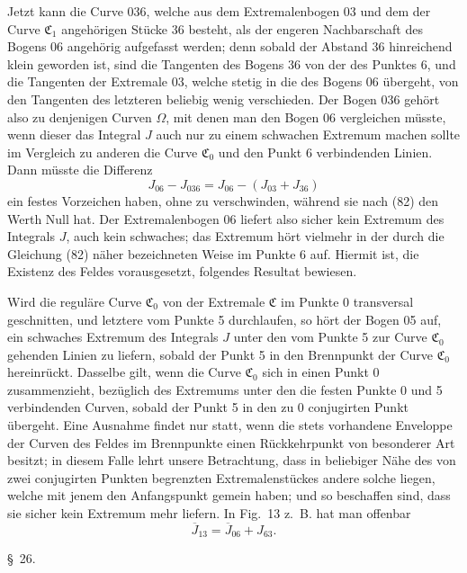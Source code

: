 \documentclass[11pt,a4paper,leqno]{article}
\begin{document}
Jetzt kann die Curve 036, welche aus dem Extremalenbogen 03 und dem der Curve $\mathfrak{C}_1$ angehörigen Stücke 36 besteht, als der engeren Nachbarschaft des Bogens 06 angehörig aufgefasst werden; denn sobald der Abstand 36 hinreichend klein geworden ist, sind die Tangenten des Bogens 36 von der des Punktes 6, und die Tangenten der Extremale 03, welche stetig in die des Bogens 06 übergeht, von den Tangenten des letzteren beliebig wenig verschieden. Der Bogen 036 gehört also zu denjenigen Curven $\Omega$, mit denen man den Bogen 06 vergleichen müsste, wenn dieser das Integral $J$ auch nur zu einem schwachen Extremum machen sollte im Vergleich zu anderen die Curve $\mathfrak{C}_0$ und den Punkt 6 verbindenden Linien. Dann müsste die Differenz
\[
J_{06}-J_{036}=J_{06}-(J_{03}+J_{36})
\]
ein festes Vorzeichen haben, ohne zu verschwinden, während sie nach (82) den Werth Null hat. Der Extremalenbogen 06 liefert also sicher kein Extremum des Integrals $J$, auch kein schwaches; das Extremum hört vielmehr in der durch die Gleichung (82) näher bezeichneten Weise im Punkte 6 auf. Hiermit ist, die Existenz des Feldes vorausgesetzt, folgendes Resultat bewiesen.

Wird die reguläre Curve $\mathfrak{C}_0$ von der Extremale $\mathfrak{C}$ im Punkte 0 transversal geschnitten, und letztere vom Punkte 5 durchlaufen, so hört der Bogen 05 auf, ein schwaches Extremum des Integrals $J$ unter den vom Punkte 5 zur Curve $\mathfrak{C}_0$ gehenden Linien zu liefern, sobald der Punkt 5 in den Brennpunkt der Curve $\mathfrak{C}_0$ hereinrückt. Dasselbe gilt, wenn die Curve $\mathfrak{C}_0$ sich in einen Punkt 0 zusammenzieht, bezüglich des Extremums unter den die festen Punkte 0 und 5 verbindenden Curven, sobald der Punkt 5 in den zu 0 conjugirten Punkt übergeht. Eine Ausnahme findet nur statt, wenn die stets vorhandene Enveloppe der Curven des Feldes im Brennpunkte einen Rückkehrpunkt von besonderer Art besitzt; in diesem Falle lehrt unsere Betrachtung, dass in beliebiger Nähe des von zwei conjugirten Punkten begrenzten Extremalenstückes andere solche liegen, welche mit jenem den Anfangspunkt gemein haben; und so beschaffen sind, dass sie sicher kein Extremum mehr liefern. In Fig.~13 z.~B. hat man offenbar
\[
\overline{J}_{13}=\overline{J}_{06}+J_{63}.
\]

\begin{center}{\large \S~26.}\end{center}
\end{document}
